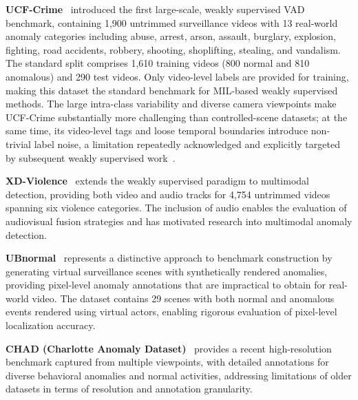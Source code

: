 \documentclass[10pt,a4paper]{article}
\begin{document}
\textbf{UCF-Crime}~\citep{sultani2018real} introduced the first large-scale, weakly supervised VAD benchmark, containing 1,900 untrimmed surveillance videos with 13 real-world anomaly categories including abuse, arrest, arson, assault, burglary, explosion, fighting, road accidents, robbery, shooting, shoplifting, stealing, and vandalism. The standard split comprises 1,610 training videos (800 normal and 810 anomalous) and 290 test videos. Only video-level labels are provided for training, making this dataset the standard benchmark for MIL-based weakly supervised methods. The large intra-class variability and diverse camera viewpoints make UCF-Crime substantially more challenging than controlled-scene datasets; at the same time, its video-level tags and loose temporal boundaries introduce non-trivial label noise, a limitation repeatedly acknowledged and explicitly targeted by subsequent weakly supervised work~\citep{zhong2019graph, tian2021weakly}.

\textbf{XD-Violence}~\citep{wu2020not} extends the weakly supervised paradigm to multimodal detection, providing both video and audio tracks for 4,754 untrimmed videos spanning six violence categories. The inclusion of audio enables the evaluation of audiovisual fusion strategies and has motivated research into multimodal anomaly detection.

\textbf{UBnormal}~\citep{acsintoae2022ubnormal} represents a distinctive approach to benchmark construction by generating virtual surveillance scenes with synthetically rendered anomalies, providing pixel-level anomaly annotations that are impractical to obtain for real-world video. The dataset contains 29 scenes with both normal and anomalous events rendered using virtual actors, enabling rigorous evaluation of pixel-level localization accuracy.

\textbf{CHAD (Charlotte Anomaly Dataset)}~\citep{pazho2023chad} provides a recent high-resolution benchmark captured from multiple viewpoints, with detailed annotations for diverse behavioral anomalies and normal activities, addressing limitations of older datasets in terms of resolution and annotation granularity.
\end{document}
